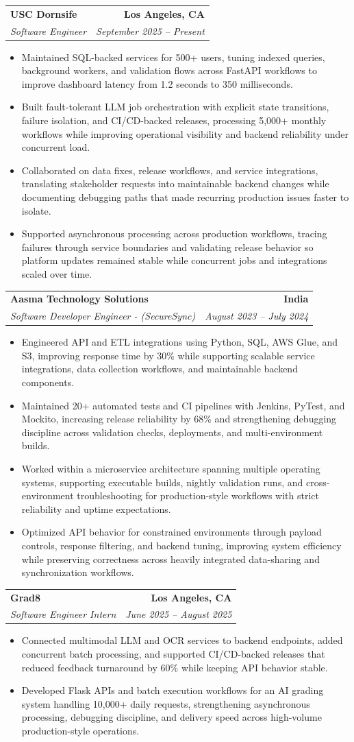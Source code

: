 \documentclass[letterpaper,10pt]{article}
\makeatletter
\newcommand{\resumeItem}[1]{\item\small{{#1 \vspace{-2pt}}}}
\newcommand{\resumeSubheading}[4]{\vspace{-1pt}\item\begin{tabular*}{1.0\textwidth}[t]{l@{\extracolsep{\fill}}r}\textbf{#1} & \textbf{\small #2} \\\textit{\small#3} & \textit{\small #4} \\\end{tabular*}\vspace{-2pt}}
\newcommand{\resumeItemListStart}{\begin{itemize}[leftmargin=0.15in,label=\textbullet,itemsep=2pt,topsep=0pt,parsep=0pt,partopsep=0pt]}
\newcommand{\resumeItemListEnd}{\end{itemize}\vspace{-4pt}}
\makeatother
\begin{document}
\resumeSubheading{USC Dornsife}{Los Angeles, CA}{Software Engineer}{September 2025 -- Present}
\resumeItemListStart
\resumeItem{Maintained SQL-backed services for 500+ users, tuning indexed queries, background workers, and validation flows across FastAPI workflows to improve dashboard latency from 1.2 seconds to 350 milliseconds.}
\resumeItem{Built fault-tolerant LLM job orchestration with explicit state transitions, failure isolation, and CI/CD-backed releases, processing 5,000+ monthly workflows while improving operational visibility and backend reliability under concurrent load.}
\resumeItem{Collaborated on data fixes, release workflows, and service integrations, translating stakeholder requests into maintainable backend changes while documenting debugging paths that made recurring production issues faster to isolate.}
\resumeItem{Supported asynchronous processing across production workflows, tracing failures through service boundaries and validating release behavior so platform updates remained stable while concurrent jobs and integrations scaled over time.}
\resumeItemListEnd

\resumeSubheading{Aasma Technology Solutions}{India}{Software Developer Engineer - (SecureSync)}{August 2023 -- July 2024}
\resumeItemListStart
\resumeItem{Engineered API and ETL integrations using Python, SQL, AWS Glue, and S3, improving response time by 30\% while supporting scalable service integrations, data collection workflows, and maintainable backend components.}
\resumeItem{Maintained 20+ automated tests and CI pipelines with Jenkins, PyTest, and Mockito, increasing release reliability by 68\% and strengthening debugging discipline across validation checks, deployments, and multi-environment builds.}
\resumeItem{Worked within a microservice architecture spanning multiple operating systems, supporting executable builds, nightly validation runs, and cross-environment troubleshooting for production-style workflows with strict reliability and uptime expectations.}
\resumeItem{Optimized API behavior for constrained environments through payload controls, response filtering, and backend tuning, improving system efficiency while preserving correctness across heavily integrated data-sharing and synchronization workflows.}
\resumeItemListEnd

\resumeSubheading{Grad8}{Los Angeles, CA}{Software Engineer Intern}{June 2025 -- August 2025}
\resumeItemListStart
\resumeItem{Connected multimodal LLM and OCR services to backend endpoints, added concurrent batch processing, and supported CI/CD-backed releases that reduced feedback turnaround by 60\% while keeping API behavior stable.}
\resumeItem{Developed Flask APIs and batch execution workflows for an AI grading system handling 10,000+ daily requests, strengthening asynchronous processing, debugging discipline, and delivery speed across high-volume production-style operations.}
\resumeItemListEnd
\end{document}
